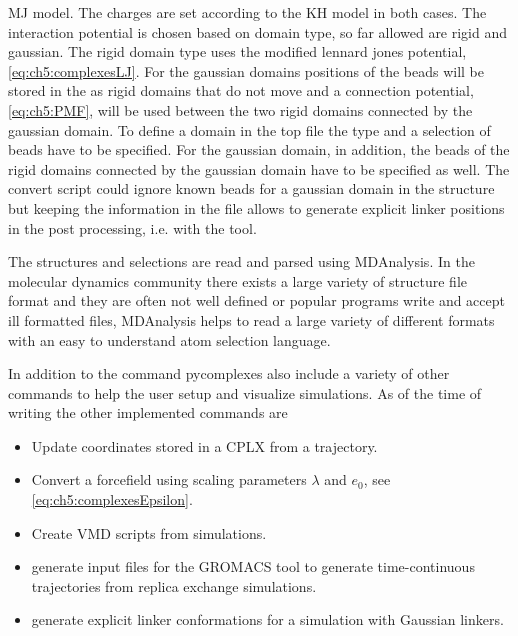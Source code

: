 \documentclass[12pt, twoside]{report}
\begin{document}
\gls{MJ} model. The charges are set according to the \gls{KH} model in both
cases. The interaction potential is chosen based on domain type, so far allowed
are rigid and gaussian. The rigid domain type uses the modified lennard jones
potential, \cref{eq:ch5:complexesLJ}. For the gaussian domains positions of the
\calpha beads will be stored in the \cplx as rigid domains that do not move and
a connection potential, \cref{eq:ch5:PMF}, will be used between the two rigid
domains connected by the gaussian domain. To define a domain in the top file the
type and a selection of beads have to be specified. For the gaussian domain, in
addition, the beads of the rigid domains connected by the gaussian domain have
to be specified as well. The convert script could ignore known beads for a
gaussian domain in the structure but keeping the information in the \cplx file
allows to generate explicit linker positions in the post processing, i.e. with
the  tool.

The structures and selections are read and parsed using
MDAnalysis\cite{oliver_beckstein-proc-scipy-2016, Michaud-agrawal2011}. In the
molecular dynamics community there exists a large variety of structure file
format and they are often not well defined or popular programs write and accept
ill formatted files, MDAnalysis helps to read a large variety of different
formats with an easy to understand atom selection language.

In addition to the  command pycomplexes also include a
variety of other commands to help the user setup and visualize simulations. As
of the time of writing the other implemented commands are
\begin{itemize}
  \item {} Update coordinates stored in a CPLX from a
trajectory.
  \item {} Convert a forcefield using scaling parameters
\(\lambda\) and \(e_0\), see \cref{eq:ch5:complexesEpsilon}.
  \item {} Create VMD scripts from simulations.
  \item {} generate input files for the GROMACS tool
 to generate time-continuous trajectories from replica
exchange simulations.
  \item {} generate explicit linker conformations for a
simulation with Gaussian linkers.
\end{itemize}



\clearpage
{}

\clearpage
\printglossary[type=\acronymtype,title=List of Abbreviations]
\end{document}
